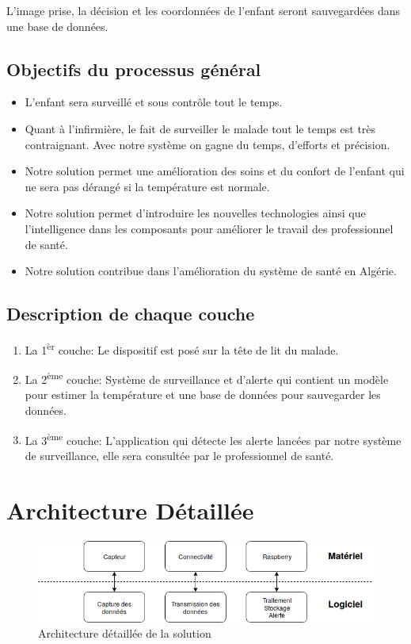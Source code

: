 \documentclass[12pt]{article}
\begin{document}
L'image prise, la décision et les coordonnées de l'enfant seront sauvegardées dans une base de données.

\subsection{Objectifs du processus général}
\begin{itemize}
	\item L’enfant sera surveillé et sous contrôle tout le temps.
	\item Quant à l'infirmière, le fait de surveiller le malade tout le temps est très contraignant. Avec notre système on gagne du temps, d'efforts et précision.	
	\item Notre solution permet une amélioration des soins et du confort de l'enfant qui ne sera pas dérangé si la température est normale.
		\item Notre solution permet d'introduire les nouvelles technologies ainsi que l'intelligence dans les composants pour améliorer le travail des professionnel de santé.
	\item Notre solution contribue dans l'amélioration du système de santé en Algérie.
\end{itemize}

\subsection{Description de chaque couche}
\begin{enumerate}
		\item La 1\textsuperscript{èr} couche: Le dispositif est posé sur la tête de lit du malade. 
		\item La 2\textsuperscript{ème} couche: Système de surveillance et d'alerte qui contient  un modèle pour estimer la température et une base de données pour sauvegarder les données.
		\item La 3\textsuperscript{ème} couche: L'application qui détecte les alerte lancées par notre système de surveillance, elle sera consultée par le professionnel de santé.
\end{enumerate}

\section{Architecture Détaillée}

\begin{figure}[h]
	\centering
	\includegraphics[width=14cm]{img-Chapiter-3/architecturedetaillee.png}
	\caption{Architecture détaillée de la solution}
\end{figure}
\end{document}
